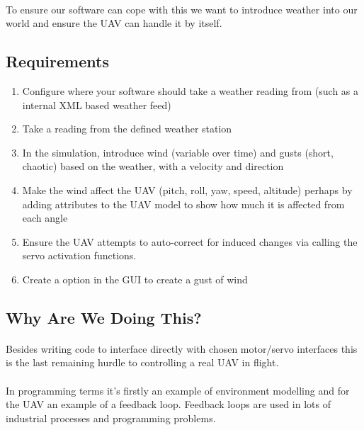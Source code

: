 \documentclass[11pt]{book}
\begin{document}
\paragraph{} To ensure our software can cope with this we want to introduce weather into our world and ensure the UAV can handle it by itself.

\subsection{Requirements}

\begin{enumerate}
\item{} Configure where your software should take a weather reading from (such as a internal XML based weather feed)
\item{} Take a reading from the defined weather station
\item{} In the simulation, introduce wind (variable over time) and gusts (short, chaotic) based on the weather, with a velocity and direction
\item{} Make the wind affect the UAV (pitch, roll, yaw, speed, altitude) perhaps by adding attributes to the UAV model to show how much it is affected from each angle
\item{} Ensure the UAV attempts to auto-correct for induced changes via calling the servo activation functions.
\item{} Create a option in the GUI to create a gust of wind
\end{enumerate}

\subsection{Why Are We Doing This?}

\paragraph{} Besides writing code to interface directly with chosen motor/servo interfaces this is the last remaining hurdle to controlling a real UAV in flight.

\paragraph{} In programming terms it's firstly an example of environment modelling and for the UAV an example of a feedback loop. Feedback loops are used in lots of industrial processes and programming problems.
\end{document}
